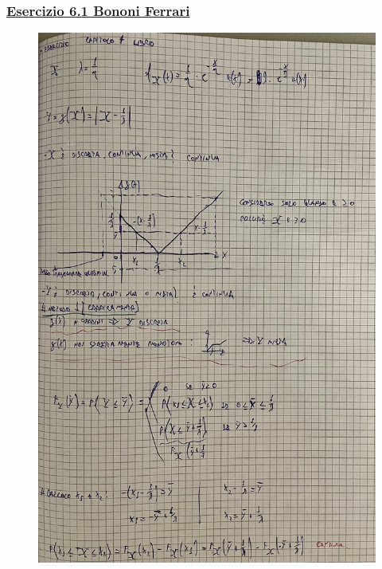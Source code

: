 \documentclass{article}
\begin{document}
\subsubsection{\underline{Esercizio 6.1 Bononi Ferrari}}
\begin{figure}[ht]
\centering
\includegraphics[scale=0.10]{ese/29.jpeg}
\end{figure}
\end{document}
